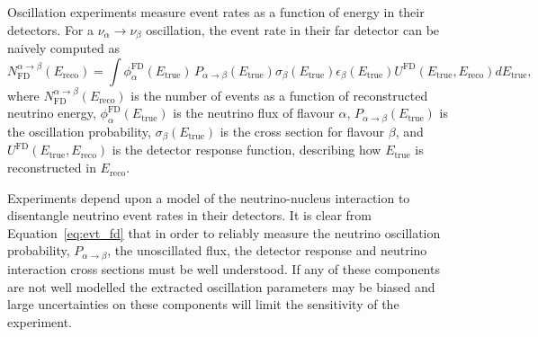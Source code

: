 Oscillation experiments measure event rates as a function of energy in their detectors. For a $\nu_\alpha \rightarrow \nu_\beta$ oscillation, the event rate in their far detector can be naively computed as
\begin{equation}
\label{eq:evt_fd}
N^{\alpha\rightarrow\beta}_\text{FD} (E_\text{reco}) = \int \phi_\alpha^\text{FD}(E_\text{true})\, P_{\alpha\rightarrow\beta}(E_\text{true}) \sigma_\beta(E_\text{true}) \epsilon_\beta(E_\text{true}) U^\text{FD}(E_\text{true}, E_\text{reco}) dE_\text{true},
\end{equation}
where $N^{\alpha\rightarrow\beta}_\text{FD} (E_\text{reco})$ is the number of events as a function of reconstructed neutrino energy, $\phi_\alpha^\text{FD}(E_\text{true})$ is the neutrino flux of flavour $\alpha$, $P_{\alpha\rightarrow\beta}(E_\text{true})$ is the oscillation probability, $\sigma_\beta(E_\text{true})$ is the cross section for flavour $\beta$, and $U^\text{FD}(E_\text{true}, E_\text{reco})$ is the detector response function, describing how $E_\text{true}$ is reconstructed in $E_\text{reco}$.

Experiments depend upon a model of the neutrino-nucleus interaction to disentangle neutrino event rates in their detectors. It is clear from Equation~\eqref{eq:evt_fd} that in order to reliably measure the neutrino oscillation probability, $P_{\alpha\rightarrow\beta}$, the unoscillated flux, the detector response and neutrino interaction cross sections must be well understood. If any of these components are not well modelled the extracted oscillation parameters may be biased and large uncertainties on these components will limit the sensitivity of the experiment. 


